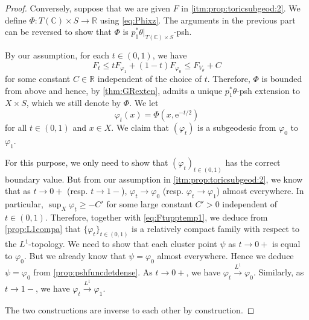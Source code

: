 \begin{proof}
    Conversely, suppose that we are given $F$ in \ref{itm:prop:toricsubgeod:2}. We define $\Phi\colon T(\mathbb{C})\times S\rightarrow \mathbb{R}$ using \eqref{eq:Phixz}.
    The arguments in the previous part can be reversed to show that $\Phi$ is $p_1^*\theta|_{T(\mathbb{C})\times S}$-psh.

    By our assumption, for each $t\in (0,1)$, we have
    \begin{equation}\label{eq:Ftupptemp1}
    F_t\leq tF_{\varphi_1}+(1-t)F_{\varphi_0}\leq F_{V_{\theta}}+C
    \end{equation}
    for some constant $C\in \mathbb{R}$ independent of the choice of $t$.
    Therefore, $\Phi$ is bounded from above and hence, by \cref{thm:GRexten}, admits a unique $p_1^*\theta$-psh extension to $X\times S$, which we still denote by $\Phi$. We let
    \[
    \varphi_t(x)=\Phi(x,\mathrm{e}^{-t/2})
    \]
    for all $t\in (0,1)$ and $x\in X$. We claim that $(\varphi_t)$ is a subgeodesic from $\varphi_0$ to $\varphi_1$.

    For this purpose, we only need to show that $(\varphi_t)_{t\in (0,1)}$ has the correct boundary value. But from our assumption in \ref{itm:prop:toricsubgeod:2}, we know that as $t\to 0+$ (resp. $t\to 1-$), $\varphi_t\to \varphi_0$ (resp. $\varphi_t\to \varphi_1$) almost everywhere. In particular, $\sup_X \varphi_t\geq -C'$ for some large constant $C'>0$ independent of $t\in (0,1)$. Therefore, together with \eqref{eq:Ftupptemp1}, we deduce from \cref{prop:L1compa} that $\{\varphi_t\}_{t\in (0,1)}$ is a relatively compact family with respect to the $L^1$-topology. We need to show that each cluster point $\psi$ as $t\to 0+$ is equal to $\varphi_0$. But we already know that $\psi=\varphi_0$ almost everywhere. Hence we deduce $\psi=\varphi_0$ from \cref{prop:pshfuncdetdense}. As $t\to 0+$, we have $\varphi_t\xrightarrow{L^1}\varphi_0$.
    Similarly, as $t\to 1-$, we have $\varphi_t\xrightarrow{L^1}\varphi_1$.

    The two constructions are inverse to each other by construction.

\end{proof}

